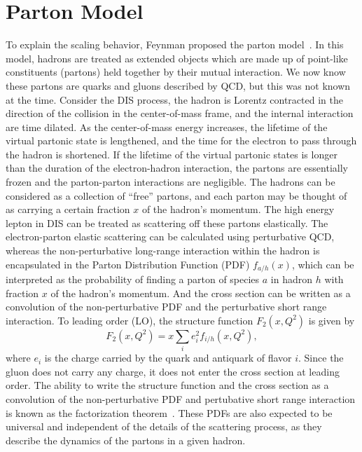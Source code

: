 \documentclass[../main.tex]{subfiles}
\begin{document}
\section{Parton Model}
\label{sec:parton}
To explain the scaling behavior, Feynman proposed the parton model~\cite{feynman1969}.
In this model, hadrons are treated as extended objects which are made up of point-like
constituents (partons) held together by their mutual interaction. We now know
these partons are quarks and gluons described by QCD, but this was not known at
the time. Consider the DIS process, the hadron is Lorentz contracted in the
direction of the collision in the center-of-mass frame, and the internal
interaction are time dilated. As the center-of-mass energy increases, the
lifetime of the virtual partonic state is lengthened, and the time for the
electron to pass through the hadron is shortened. If the lifetime of the virtual
partonic states is longer than the duration of the electron-hadron interaction,
the partons are essentially frozen and the parton-parton interactions are
negligible. The hadrons can be considered as a collection of ``free'' partons,
and each parton may be thought of as carrying a certain fraction $x$ of the
hadron's momentum. The high energy lepton in DIS can be treated as scattering
off these partons elastically. The electron-parton elastic scattering can be
calculated using perturbative QCD, whereas the non-perturbative long-range
interaction within the hadron is encapsulated in the Parton Distribution
Function (PDF) $f_{a/h}\left(x\right)$, which can be interpreted as the probability
of finding a parton of species $a$ in hadron $h$ with fraction $x$ of the hadron's momentum.
And the cross section can be written as a convolution
of the non-perturbative PDF and the perturbative short range interaction. To leading
order (LO), the structure function $F_2\left(x,Q^2\right)$ is given by
\begin{equation}
	F_2\left(x,Q^2\right)=x\sum_i e^2_i f_{i/h}\left(x,Q^2\right),
	\label{eq:F2_parton}
\end{equation}
where $e_i$ is the charge carried by the quark and antiquark of flavor $i$. Since the
gluon does not carry any charge, it does not enter the cross section at leading
order. The ability to write the structure function and the cross section as a
convolution of the non-perturbative PDF and pertubative short range interaction
is known as the factorization theorem~\cite{collins1989}. These PDFs are also
expected to be universal and independent of the details of the scattering
process, as they describe the dynamics of the partons in a given hadron.
\end{document}
